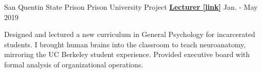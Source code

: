 \begin{cventries}
    
  \cventry
    {San Quentin State Prison} %
    {Prison University Project}
    {\href{https://www.neh.gov/about/awards/national-humanities-medals/prison-university-project}{\textbf{Lecturer [link]}}} %
    {Jan. - May 2019} %
    {
      \begin{cvitems} %
        \item {Designed and lectured a new curriculum in General Psychology for incarcerated students. I brought human brains into the classroom to teach neuroanatomy, mirroring the UC Berkeley student experience. Provided executive board with formal analysis of organizational operations.}
      \end{cvitems}
    }
    


\end{cventries}
